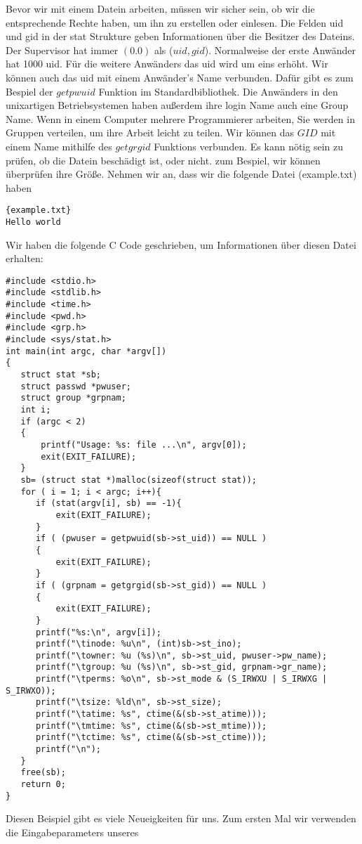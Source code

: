 \documentclass{article}[12pt]
\begin{document}
Bevor wir mit einem Datein arbeiten, müssen wir sicher sein, ob wir die entsprechende Rechte haben, um ihn zu 
erstellen oder einlesen. Die Felden uid und gid in der stat Strukture geben Informationen über die Besitzer des Dateins.
Der Supervisor hat immer $(0.0)$ als ($uid,gid$). Normalweise der erste Anwänder hat 1000 uid.
Für die weitere Anwänders das uid wird um eins erhöht. 
Wir können auch das uid mit einem Anwänder's Name verbunden. Dafür gibt es zum Bespiel der $getpwuid$ Funktion 
im Standardbibliothek. Die Anwänders in den unixartigen Betriebsystemen haben außerdem ihre login Name auch eine
Group Name. Wenn in einem Computer mehrere Programmierer arbeiten, Sie werden in Gruppen verteilen, um ihre
Arbeit leicht zu teilen. Wir können das $GID$ mit einem Name mithilfe des $getgrgid$ Funktions verbunden.
Es kann nötig sein zu prüfen, ob die Datein beschädigt ist, oder nicht. 
zum Bespiel, wir können überprüfen ihre Größe. Nehmen wir an, dass wir die folgende Datei (example.txt) haben
\begin{lstlisting}{example.txt}
Hello world
\end{lstlisting}
Wir haben die folgende C Code geschrieben, um Informationen über diesen Datei erhalten:
\begin{lstlisting}
#include <stdio.h>
#include <stdlib.h>
#include <time.h>
#include <pwd.h>
#include <grp.h>
#include <sys/stat.h>
int main(int argc, char *argv[])
{
   struct stat *sb;
   struct passwd *pwuser;
   struct group *grpnam;
   int i;
   if (argc < 2)
   {
       printf("Usage: %s: file ...\n", argv[0]);
       exit(EXIT_FAILURE);
   }
   sb= (struct stat *)malloc(sizeof(struct stat));
   for ( i = 1; i < argc; i++){
      if (stat(argv[i], sb) == -1){
          exit(EXIT_FAILURE);
      }
      if ( (pwuser = getpwuid(sb->st_uid)) == NULL )
      {
          exit(EXIT_FAILURE);
      }
      if ( (grpnam = getgrgid(sb->st_gid)) == NULL )
      {
          exit(EXIT_FAILURE);
      }
      printf("%s:\n", argv[i]);
      printf("\tinode: %u\n", (int)sb->st_ino);
      printf("\towner: %u (%s)\n", sb->st_uid, pwuser->pw_name);
      printf("\tgroup: %u (%s)\n", sb->st_gid, grpnam->gr_name);
      printf("\tperms: %o\n", sb->st_mode & (S_IRWXU | S_IRWXG | S_IRWXO));
      printf("\tsize: %ld\n", sb->st_size);
      printf("\tatime: %s", ctime(&(sb->st_atime)));
      printf("\tmtime: %s", ctime(&(sb->st_mtime)));
      printf("\tctime: %s", ctime(&(sb->st_ctime)));
      printf("\n");
   }
   free(sb);
   return 0;
}
\end{lstlisting}
Diesen Beispiel gibt es viele Neueigkeiten für uns. Zum ersten Mal wir verwenden die Eingabeparameters unseres 
\end{document}
